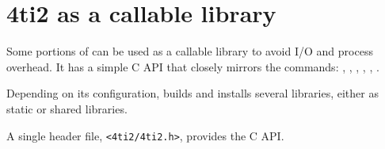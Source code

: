 \chapter{4ti2 as a callable library}


Some portions of \FourTiTwo{} can be used as a callable library to avoid I/O
and process overhead.  It has a simple C API that closely mirrors the 
commands: , , , ,
, .

Depending on its configuration, \FourTiTwo builds and installs several
libraries, either as static or shared libraries.

A single header file, \texttt{<4ti2/4ti2.h>}, provides the C API.

{\scriptsize

}



